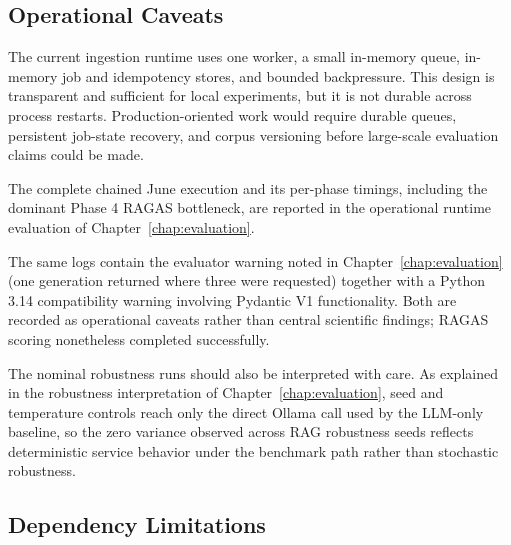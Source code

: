 \subsection{Operational Caveats}

The current ingestion runtime uses one worker, a small in-memory queue, in-memory job and idempotency stores, and bounded backpressure. This design is transparent and sufficient for local experiments, but it is not durable across process restarts. Production-oriented work would require durable queues, persistent job-state recovery, and corpus versioning before large-scale evaluation claims could be made.

The complete chained June execution and its per-phase timings, including the dominant Phase 4 RAGAS bottleneck, are reported in the operational runtime evaluation of Chapter~\ref{chap:evaluation}.

The same logs contain the evaluator warning noted in Chapter~\ref{chap:evaluation} (one generation returned where three were requested) together with a Python 3.14 compatibility warning involving Pydantic V1 functionality. Both are recorded as operational caveats rather than central scientific findings; RAGAS scoring nonetheless completed successfully.

The nominal robustness runs should also be interpreted with care. As explained in the robustness interpretation of Chapter~\ref{chap:evaluation}, seed and temperature controls reach only the direct Ollama call used by the LLM-only baseline, so the zero variance observed across RAG robustness seeds reflects deterministic service behavior under the benchmark path rather than stochastic robustness.

\subsection{Dependency Limitations}

